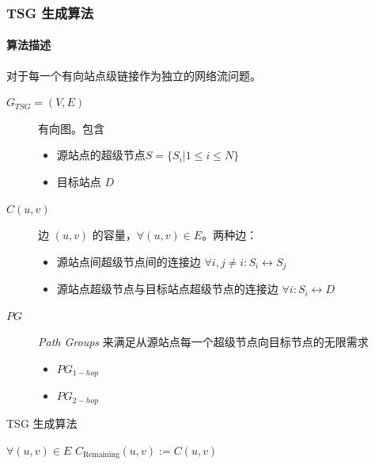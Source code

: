     \begin{frame}
        \frametitle{TSG 生成算法}
        \framesubtitle{算法描述}
        对于每一个有向站点级链接作为独立的网络流问题。
        \begin{description}
            \item[$G_{TSG}=(V,E)$] 有向图。包含
            \begin{itemize}
                \item 源站点的超级节点$S=\{S_i|1\leq i\leq N\}$
                \item 目标站点 $D$
            \end{itemize}
            \item[$C(u,v)$] 边 $(u,v)$ 的容量，$\forall (u,v)\in E$。两种边：
            \begin{itemize}
                \item 源站点间超级节点间的连接边 $\forall i,j\neq i:S_i\leftrightarrow S_j$
                \item 源站点超级节点与目标站点超级节点的连接边 $\forall i: S_i\leftrightarrow D$
            \end{itemize} 
            \item[$PG$] \emph{Path Groups} 来满足从源站点每一个超级节点向目标节点的无限需求
            \begin{itemize}
                \item $PG_{1-hop}$
                \item $PG_{2-hop}$
            \end{itemize} 
        \end{description}
    \end{frame}

    \begin{frame}
        \begin{algorithm*}[H]
            \small
            \caption{TSG 生成算法}\label{alg:tsggen}
            $\forall (u,v)\in E$ $C_\text{Remaining}(u,v):=C(u,v)$\;
        \end{algorithm*}
    \end{frame}

